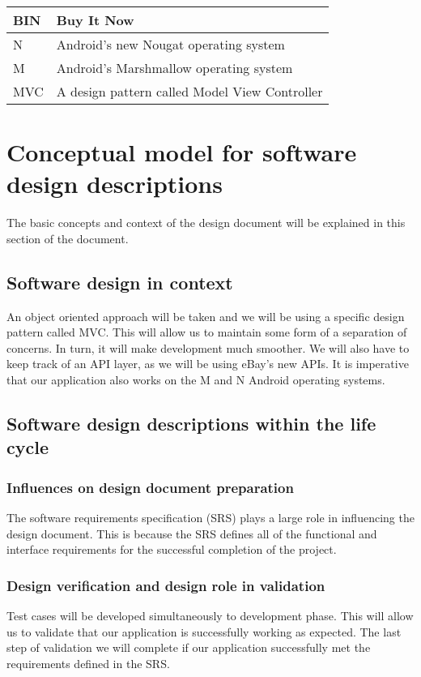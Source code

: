 \documentclass[journal,compsoc, 10pt, draftclsnofoot, onecolumn]{IEEEtran}
\begin{document}
\begin{table}[!h]
\begin{tabularx}{\textwidth}{l|X}
BIN                    	      & Buy It Now                                                                                                                    \\ \hline
N                   	      & Android's new Nougat operating system 
\\ \hline
M                   	      & Android's Marshmallow operating system                                                                                                                   
\\ \hline
MVC                   	      & A design pattern called Model View Controller
\\ \hline
\end{tabularx}
\end{table}
\FloatBarrier


\section{Conceptual model for software design descriptions}
The basic concepts and context of the design document will be explained in this 
section of the document.

\subsection{Software design in context}
An object oriented approach will be taken and we will be using a specific 
design pattern called MVC. This will allow us to maintain some form of a 
separation of concerns. In turn, it will make development much smoother. We will
 also have to keep track of an API layer, as we will be using eBay's new APIs. 
It is imperative that our application also works on the M and N Android 
operating systems.

\subsection{Software design descriptions within the life cycle}
\subsubsection{Influences on design document preparation}
The software requirements specification (SRS) plays a large role in influencing 
the design document. This is because the SRS defines all of the functional and 
interface requirements for the successful completion of the project.

\subsubsection{Design verification and design role in validation}
Test cases will be developed simultaneously to development phase. This will 
allow us to validate that our application is successfully working as expected. 
The last step of validation we will complete if our application successfully 
met the requirements defined in the SRS.
\end{document}
